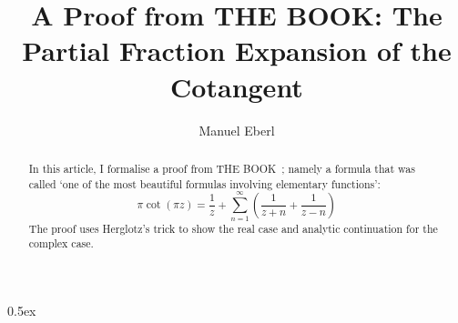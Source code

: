 \documentclass[11pt,a4paper]{article}
\begin{document}
\title{A Proof from THE BOOK: The Partial Fraction Expansion of the Cotangent}
\author{Manuel Eberl}
\maketitle

\begin{abstract}
In this article, I formalise a proof from THE BOOK~\cite[Chapter~23]{thebook}; namely a formula that was called `one of the most beautiful formulas involving elementary functions':
\[\pi \cot(\pi z) = \frac{1}{z} + \sum_{n=1}^\infty\left(\frac{1}{z+n} + \frac{1}{z-n}\right)\]
The proof uses Herglotz's trick to show the real case and analytic continuation for the complex case.
\end{abstract}

\tableofcontents
\newpage
\parindent 0pt\parskip 0.5ex



\nocite{corless96}


\end{document}
